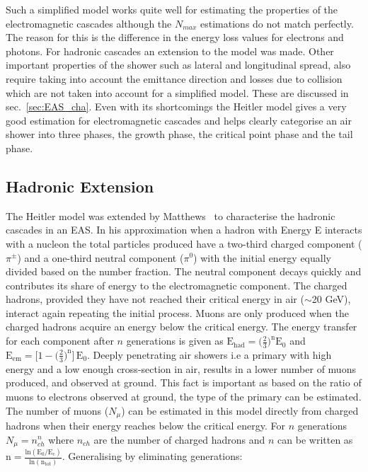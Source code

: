 Such a simplified model works quite well for estimating the properties of the electromagnetic cascades although the $N_{max}$ estimations do not match perfectly. The reason for this is the difference in the energy loss values for electrons and photons. For hadronic cascades an extension to the model was made. Other important properties of the shower such as lateral and longitudinal spread, also require taking into account the emittance direction and losses due to collision which are not taken into account for a simplified model. These are discussed in sec.~\ref{sec:EAS_cha}. Even with its shortcomings the Heitler model gives a very good estimation for electromagnetic cascades and helps clearly categorise an air shower into three phases, the growth phase, the critical point phase and the tail phase. 

\subsection{Hadronic Extension}
\label{sec:Dev_Had}
The Heitler model was extended by Matthews~\cite{MATTHEWS2005387} to characterise the hadronic cascades in an EAS. In his approximation when a hadron with Energy E interacts with a nucleon the total particles produced have a two-third charged component ($\pi^\pm $) and a one-third neutral component ($\pi^0$) with the initial energy equally divided based on the number fraction. The neutral component decays quickly and contributes its share of energy to the electromagnetic component. The charged hadrons, provided they have not reached their critical energy in air ($\sim$20 GeV), interact again repeating the initial process. Muons are only produced when the charged hadrons acquire an energy below the critical energy. The energy transfer for each component after $n$ generations is given as $\mathrm{E_{had} = \biggl(\frac{2}{3}\biggr)^n E_0}$ and $\mathrm{E_{em} = \big[1- \biggl(  \frac{2}{3}\biggr)^n\big] \, E_0}$. Deeply penetrating air showers i.e a primary with high energy and a low enough cross-section in air, results in a lower number of muons produced, and observed at ground. This fact is important as based on the ratio of muons to electrons observed at ground, the type of the primary can be estimated. The number of muons ($N_{\mu}$) can be estimated in this model directly from charged hadrons when their energy reaches below the critical energy. For $n$ generations $N_{\mu} = n_{ch}^n$ where $n_{ch}$ are the number of charged hadrons and $n$ can be written as $\mathrm{n = \frac{ln(E_0/E_c)}{ln(n_{tot})}}$. Generalising by eliminating generations:

